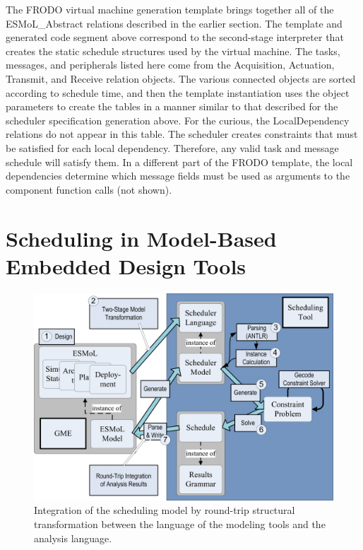 The FRODO virtual machine generation template brings together all of the
ESMoL\_Abstract relations described in the earlier section.  The template and generated code
segment above correspond to the second-stage interpreter that creates the static schedule
structures used by the virtual machine.  The tasks, messages, and peripherals
listed here come from the Acquisition, Actuation, Transmit, and Receive
relation objects.  The various connected objects are sorted according to
schedule time, and then the template instantiation uses the object parameters
to create the tables in a manner similar to that described for the scheduler
specification generation above.  For the curious, the LocalDependency relations
do not appear in this table.  The scheduler creates constraints that must be
satisfied for each local dependency.  Therefore, any valid task and message
schedule will satisfy them.  In a different part of the FRODO template, the
local dependencies determine which message fields must be used as
arguments to the component function calls (not shown).

\section{Scheduling in Model-Based Embedded Design Tools}
\label{sect:schedtool}

\begin{figure}
\centering
\includegraphics[width=0.5\columnwidth]{figures/sched_integration.png}
    \caption{Integration of the scheduling model by round-trip structural transformation between the language 
of the modeling tools and the analysis language.}
    \label{fig:sched_int}
\end{figure}


